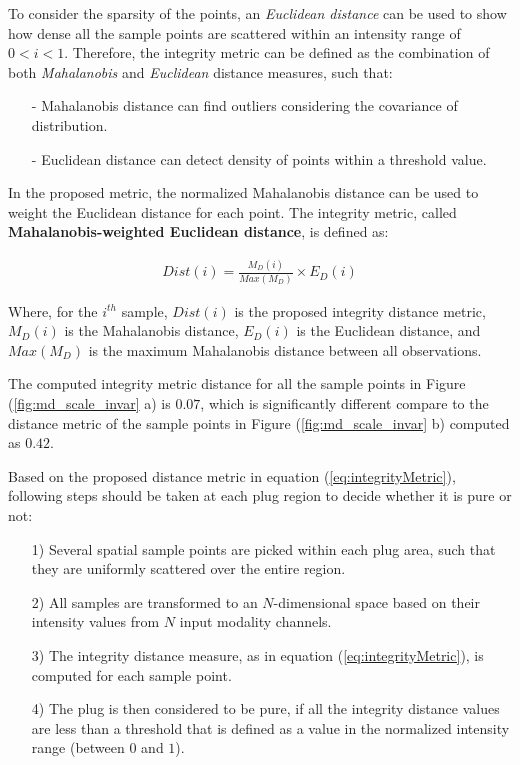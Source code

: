 To consider the sparsity of the points, an \textit{Euclidean distance} can be used to show how dense all the sample points are scattered within an intensity range of $0<i<1$. Therefore, the integrity metric can be defined as the combination of both \textit{Mahalanobis} and \textit{Euclidean} distance measures, such that:

\begin{itemize}
    \item[-] Mahalanobis distance can find outliers considering the covariance of distribution.
    \item[-] Euclidean distance can detect density of points within a threshold value.
\end{itemize}

In the proposed metric, the normalized Mahalanobis distance can be used to weight the Euclidean distance for each point. The integrity metric, called \textbf{Mahalanobis-weighted Euclidean distance}, is defined as:

\begin{equation}
\label{eq:integrityMetric}
\begin{gathered}
Dist(i) = \frac{M_D(i)}{Max(M_D)} \times E_D(i)
\end{gathered}
\end{equation}

Where, for the $i^{th}$ sample, $Dist(i)$ is the proposed integrity distance metric, $M_D(i)$ is the Mahalanobis distance, $E_D(i)$ is the Euclidean distance, and $Max(M_D)$ is the maximum Mahalanobis distance between all observations.

The computed integrity metric distance for all the sample points in Figure (\ref{fig:md_scale_invar} a) is $0.07$, which is significantly different compare to the distance metric of the sample points in Figure (\ref{fig:md_scale_invar} b) computed as $0.42$.

Based on the proposed distance metric in equation (\ref{eq:integrityMetric}), following steps should be taken at each plug region to decide whether it is pure or not:

\begin{itemize}
    \item[1)] Several spatial sample points are picked within each plug area, such that they are uniformly scattered over the entire region.
    \item[2)] All samples are transformed to an $N$-dimensional space based on their intensity values from $N$ input modality channels.
    \item[3)] The integrity distance measure, as in equation (\ref{eq:integrityMetric}), is computed for each sample point.
    \item[4)] The plug is then considered to be pure, if all the integrity distance values are less than a threshold that is defined as a value in the normalized intensity range (between $0$ and $1$).
\end{itemize}

